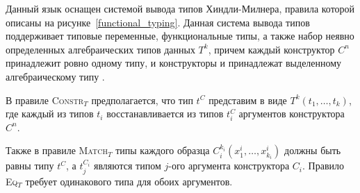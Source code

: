 Данный язык оснащен системой вывода типов Хиндли-Милнера, правила которой описаны на рисунке~\ref{functional_typing}. Данная система вывода типов поддерживает типовые переменные, функциональные типы, а также набор неявно определенных алгебраических типов данных $T^k$, причем каждый конструктор $C^n$ принадлежит ровно одному типу, и конструкторы  и  принадлежат выделенному алгебраическому типу .

В правиле \textsc{Constr$_T$} предполагается, что тип $t^C$ представим в виде $T^k(t_1,\dots,t_k)$, где каждый из типов $t_i$ восстанавливается из типов $t_i^C$ аргументов конструктора $C^n$.


 Также в правиле \textsc{Match$_T$} типы каждого образца $C_i^{k_i}(x^i_1,\dots,x^i_{k_i})$ должны быть равны типу $t^C$, а  $t^{C_i}_j$ являются типом $j$-ого аргумента конструктора $C_i$. Правило \textsc{Eq$_T$} требует одинакового типа для обоих аргументов.

\FloatBarrier

\setarrow{\to}
\newcommand{\step}[2]{\trans{\inbr{#1}}{}{\inbr{#2}}}

